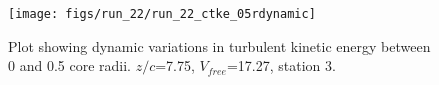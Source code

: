 \begin{figure}[H]
\centering
\texttt{[image: figs/run\_22/run\_22\_ctke\_05rdynamic]}
\caption{Plot showing dynamic variations in turbulent kinetic energy between 0 and 0.5 core radii. $z/c$=7.75, $V_{free}$=17.27, station 3.}
\label{fig:run_22_ctke_05rdynamic}
\end{figure}


